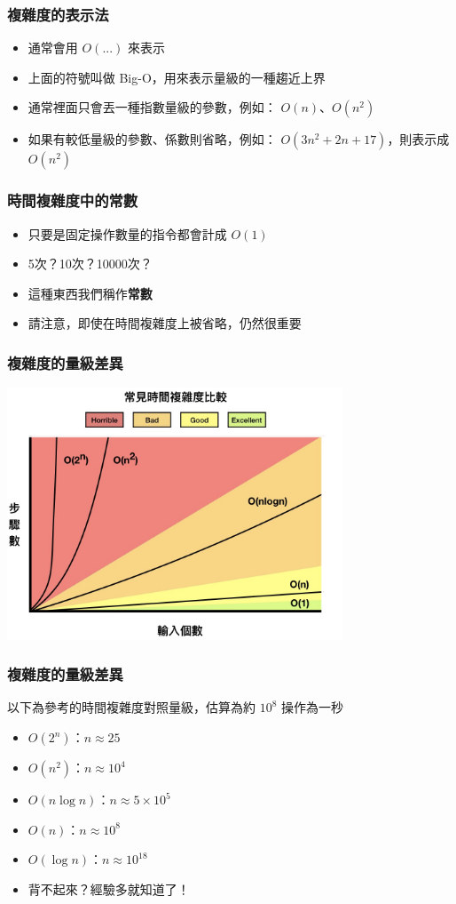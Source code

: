 \documentclass[mathserif]{beamer}
\begin{document}
\begin{frame}
    \frametitle{複雜度的表示法}
    \begin{itemize}
        \item 通常會用 $O(...)$ 來表示
        \item 上面的符號叫做 Big-O，用來表示量級的一種趨近上界
        \item<2-> 通常裡面只會丟一種指數量級的參數，例如： $O(n)$、$O(n^2)$
        \item<2-> 如果有較低量級的參數、係數則省略，例如： $O(3n^2+2n+17)$，則表示成 $O(n^2)$
    \end{itemize}
\end{frame}

\begin{frame}
    \frametitle{時間複雜度中的常數}
    \begin{itemize}
        \item 只要是固定操作數量的指令都會計成 $O(1)$
        \item 5次？10次？10000次？
        \item<2-> 這種東西我們稱作\textbf{常數}
        \item<2-> 請注意，即使在時間複雜度上被省略，仍然很重要
    \end{itemize}
\end{frame}

\begin{frame}
    \frametitle{複雜度的量級差異}
    \includegraphics[width=10.0cm]{img/time.png}
\end{frame}

\begin{frame}
    \frametitle{複雜度的量級差異}
    以下為參考的時間複雜度對照量級，估算為約 $10^8$ 操作為一秒
    \begin{itemize}
        \item $O(2^n)$：$n \approx 25$
        \item $O(n^2)$：$n \approx 10^4$
        \item $O(n \log{n})$：$n \approx 5 \times 10^5$
        \item $O(n)$：$n \approx 10^8$
        \item $O(\log{n})$：$n \approx 10^{18}$
        \vspace{0.5cm}
        \item<2-> 背不起來？經驗多就知道了！
    \end{itemize}
\end{frame}
\end{document}
